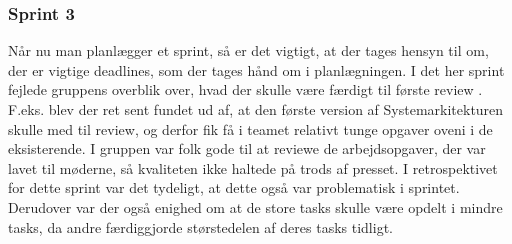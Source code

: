 \documentclass[a4paper,12pt,fleqn,oneside]{article}
\begin{document}
\subsubsection{Sprint 3}
Når nu man planlægger et sprint, så er det vigtigt, at der tages hensyn til om, der er vigtige deadlines, som der tages hånd om i planlægningen. I det her sprint fejlede gruppens overblik over, hvad der skulle være færdigt til første review . F.eks. blev der ret sent fundet ud af, at den første version af Systemarkitekturen skulle med til review, og derfor fik få i teamet relativt tunge opgaver oveni i de eksisterende. I gruppen var folk gode til at reviewe de arbejdsopgaver, der var lavet til møderne, så kvaliteten ikke haltede på trods af presset. I retrospektivet for dette sprint var det tydeligt, at dette også var problematisk i sprintet. Derudover var der også enighed om at de store tasks skulle være opdelt i mindre tasks, da andre færdiggjorde størstedelen af deres tasks tidligt. 
\end{document}
